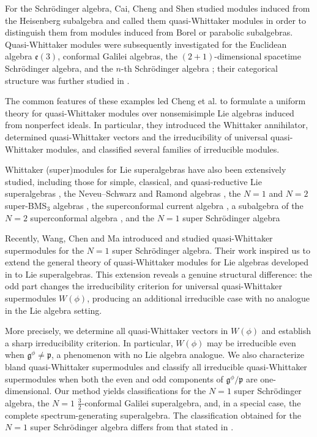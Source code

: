 \documentclass[12pt,reqno]{article}
\def\F{\mathfrak}
\begin{document}
For the Schr\"odinger algebra, Cai, Cheng and Shen \cite{CCS} studied modules induced from the Heisenberg subalgebra and called them quasi-Whittaker modules in order to distinguish them from modules induced from Borel or parabolic subalgebras. Quasi-Whittaker modules were subsequently investigated for the Euclidean algebra $\F{e}(3)$, conformal Galilei algebras, the $(2+1)$-dimensional spacetime Schr\"odinger algebra, and the $n$-th Schr\"odinger algebra \cite{CC,CL,CSZ,CW1}; their categorical structure was further studied in \cite{JLZ}. 

The common features of these examples led Cheng et al. \cite{CGLZZ} to formulate a uniform theory for quasi-Whittaker modules over nonsemisimple Lie algebras induced from nonperfect ideals. In particular, they introduced the Whittaker annihilator, determined quasi-Whittaker vectors and the irreducibility of universal quasi-Whittaker modules, and classified several families of irreducible modules.


    Whittaker (super)modules for Lie superalgebras have also been extensively studied, including those for simple, classical, and quasi-reductive Lie superalgebras \cite{BCW,C,CC2}, the Neveu--Schwarz and Ramond algebras \cite{LPX1,LPX2,CYZ}, the $N=1$ and $N=2$ super-BMS$_3$ algebras \cite{LPXZ1,DGL,WGL}, the superconformal current algebra \cite{LPXZ2}, a subalgebra of the $N=2$ superconformal algebra \cite{JXZ}, and the $N=1$ super Schr\"odinger algebra \cite{WCM2}
    
Recently, Wang, Chen and Ma \cite{WCM} introduced and studied quasi-Whittaker supermodules for the $N=1$ super Schrödinger algebra. Their work inspired us to extend the general theory of quasi-Whittaker modules for Lie algebras developed in \cite{CGLZZ} to Lie superalgebras. This extension reveals a genuine structural difference: the odd part changes the irreducibility criterion for universal quasi-Whittaker supermodules $W(\phi)$, producing an additional irreducible case with no analogue in the Lie algebra setting.

More precisely, we determine all quasi-Whittaker vectors in $W(\phi)$ and establish a sharp irreducibility criterion. In particular, $W(\phi)$ may be irreducible even when $\F{g}^{\phi}\neq\F{p}$, a phenomenon with no Lie algebra analogue. We also characterize bland quasi-Whittaker supermodules and classify all irreducible quasi-Whittaker supermodules when both the even and odd components of $\F{g}^{\phi}/\F{p}$ are one-dimensional. Our method yields classifications for the $N=1$ super Schrödinger algebra, the $N=1$ $\frac{3}{2}$-conformal Galilei superalgebra, and, in a special case, the complete spectrum-generating superalgebra. The classification obtained for the $N=1$ super Schrödinger algebra differs from that stated in \cite{WCM}.
\end{document}
